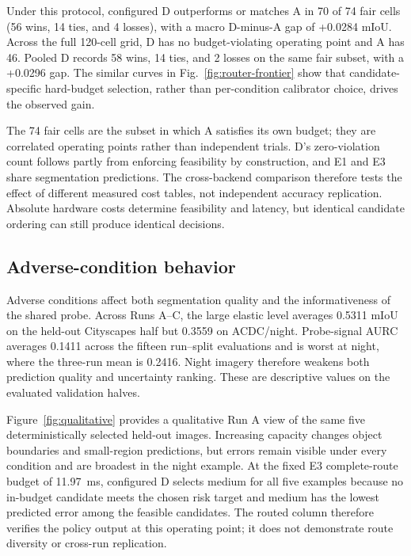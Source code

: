 \documentclass[a4paper,review,12pt]{elsarticle}
\newcommand{\miou}{mIoU}
\begin{document}
Under this protocol, configured D outperforms or matches A in 70 of 74 fair cells (56 wins, 14 ties, and 4 losses), with a macro D-minus-A gap of +0.0284 \miou{}. Across the full 120-cell grid, D has no budget-violating operating point and A has 46. Pooled D records 58 wins, 14 ties, and 2 losses on the same fair subset, with a +0.0296 gap. The similar curves in Fig.~\ref{fig:router-frontier} show that candidate-specific hard-budget selection, rather than per-condition calibrator choice, drives the observed gain.

The 74 fair cells are the subset in which A satisfies its own budget; they are correlated operating points rather than independent trials. D's zero-violation count follows partly from enforcing feasibility by construction, and E1 and E3 share segmentation predictions. The cross-backend comparison therefore tests the effect of different measured cost tables, not independent accuracy replication. Absolute hardware costs determine feasibility and latency, but identical candidate ordering can still produce identical decisions.

\subsection{Adverse-condition behavior}

Adverse conditions affect both segmentation quality and the informativeness of the shared probe. Across Runs A--C, the large elastic level averages 0.5311 \miou{} on the held-out Cityscapes half but 0.3559 on ACDC/night. Probe-signal AURC averages 0.1411 across the fifteen run--split evaluations and is worst at night, where the three-run mean is 0.2416. Night imagery therefore weakens both prediction quality and uncertainty ranking. These are descriptive values on the evaluated validation halves.

Figure~\ref{fig:qualitative} provides a qualitative Run A view of the same five deterministically selected held-out images. Increasing capacity changes object boundaries and small-region predictions, but errors remain visible under every condition and are broadest in the night example. At the fixed E3 complete-route budget of 11.97~ms, configured D selects medium for all five examples because no in-budget candidate meets the chosen risk target and medium has the lowest predicted error among the feasible candidates. The routed column therefore verifies the policy output at this operating point; it does not demonstrate route diversity or cross-run replication.
\end{document}
